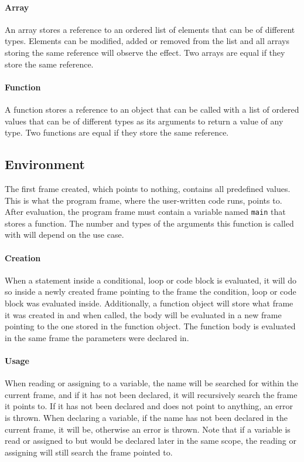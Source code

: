 \paragraph{Array}

An array stores a reference to an ordered list of elements that can be of different types. Elements can be modified, added or removed from the list and all arrays storing the same reference will observe the effect. Two arrays are equal if they store the same reference.

\paragraph{Function}

A function stores a reference to an object that can be called with a list of ordered values that can be of different types as its arguments to return a value of any type. Two functions are equal if they store the same reference.

\subsection{Environment}

The first frame created, which points to nothing, contains all predefined values. This is what the program frame, where the user-written code runs, points to. After evaluation, the program frame must contain a variable named \verb|main| that stores a function. The number and types of the arguments this function is called with will depend on the use case.

\paragraph{Creation}

When a statement inside a conditional, loop or code block is evaluated, it will do so inside a newly created frame pointing to the frame the condition, loop or code block was evaluated inside. Additionally, a function object will store what frame it was created in and when called, the body will be evaluated in a new frame pointing to the one stored in the function object. The function body is evaluated in the same frame the parameters were declared in.

\paragraph{Usage}

When reading or assigning to a variable, the name will be searched for within the current frame, and if it has not been declared, it will recursively search the frame it points to. If it has not been declared and does not point to anything, an error is thrown. When declaring a variable, if the name has not been declared in the current frame, it will be, otherwise an error is thrown. Note that if a variable is read or assigned to but would be declared later in the same scope, the reading or assigning will still search the frame pointed to.

